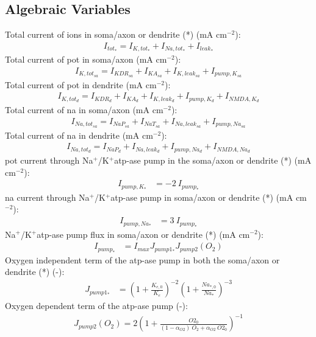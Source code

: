 \documentclass[11pt]{elsarticle}
\newcommand{\sodpot}{Na$^+$/K$^+$\xspace}
\newcommand{\mAcm}{mA cm$^{-2}$\xspace}
\newcommand{\na}{\gls{na}\xspace}
\newcommand{\pot}{\gls{pot}\xspace}
\begin{document}
\subsection{Algebraic Variables}
%
Total current of ions in soma/axon or dendrite (*) (\mAcm):
\begin{align}
I_{tot_{*}} =I_{K,tot_{*}} +  I_{Na,tot_{*}} + I_{leak_{*}}
\end{align}
%
Total current of \pot in soma/axon (\mAcm):
\begin{align}
I_{K,tot_{sa}} = I_{KDR_{sa}} + I_{KA_{sa}} + I_{K,leak_{sa}} + I_{pump,K_{sa}}
\end{align}
%
Total current of \pot in dendrite (\mAcm):
\begin{align}
I_{K,tot_{d}} = I_{KDR_{d}} + I_{KA_{d}} + I_{K,leak_{d}} + I_{pump,K_{d}} + I_{NMDA,K_d}
\end{align}
%
Total current of \na in soma/axon (\mAcm):
\begin{align}
I_{Na,tot_{sa}} = I_{NaP_{sa}} + I_{NaT_{sa}} + I_{Na,leak_{sa}} + I_{pump,Na_{sa}}
\end{align}
%
Total current of \na in dendrite (\mAcm):
\begin{align}
I_{Na,tot_{d}} = I_{NaP_{d}} + I_{Na,leak_{d}} + I_{pump,Na_{d}} + I_{NMDA,Na_d}
\end{align}
%
\pot current through \sodpot \gls{atp}-ase pump in the soma/axon or dendrite (*) (\mAcm):
\begin{align}
I_{pump,K_{*}} &= -2 \: I_{pump_{*}}
\end{align}
%
\na current through \sodpot \gls{atp}-ase pump in soma/axon or dendrite (*) (\mAcm):
\begin{align}
I_{pump,Na_{*}} &= 3 \: I_{pump_{*}}
\end{align}
%
 \sodpot \gls{atp}-ase pump flux in soma/axon or dendrite (*) (\mAcm):
\begin{align}
I_{pump_{*}} &= I_{max} J_{pump1_{*}} J_{pump2}(O_2)
\end{align}
%
Oxygen independent term of the \gls{atp}-ase pump in both the soma/axon or dendrite (*) (-):
	\begin{align}
	J_{pump1_{*}} &= \left( 1 + \frac{ K_{e,0} }{K_e} \right)^{-2} \left( 1 + \frac{ Na_{*,0} }{Na_{*}} \right)^{-3} 
	\end{align}
%
Oxygen dependent term of the \gls{atp}-ase pump (-): 
	\begin{align}
	J_{pump2}(O_2) = 2 \left( 1 + \frac{ O2_0 }{ (1 - \alpha_{O2}) \: O_2 + \alpha_{O2} \: O2_0  }    \right)^{-1}
	\end{align}
\end{document}

